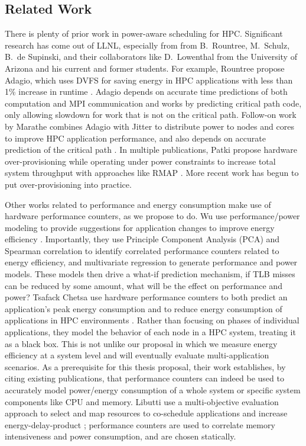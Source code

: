 \subsection{Related Work}


There is plenty of prior work in power-aware scheduling for HPC.
Significant research has come out of LLNL, especially from from B.~Rountree, M.~Schulz, B.~de Supinski, and their collaborators like D.~Lowenthal from the University of Arizona and his current and former students.
For example, Rountree \etal propose Adagio, which uses DVFS for saving energy in HPC applications with less than 1\% increase in runtime \cite{RountreeAdagio}.
Adagio depends on accurate time predictions of both computation and MPI communication and works by predicting critical path code, only allowing slowdown for work that is not on the critical path.
Follow-on work by Marathe \etal combines Adagio with Jitter \cite{Jitter} to distribute power to nodes and cores to improve HPC application performance, and also depends on accurate prediction of the critical path \cite{Marathe2015}.
In multiple publications, Patki \etal propose hardware over-provisioning while operating under power constraints to increase total system throughput with approaches like RMAP \cite{PatkiRMAP}.
More recent work has begun to put over-provisioning into practice.

Other works related to performance and energy consumption make use of hardware performance counters, as we propose to do.
Wu \etal use performance/power modeling to provide suggestions for application changes to improve energy efficiency \cite{WuHPCComputer}.
Importantly, they use Principle Component Analysis (PCA) and Spearman correlation to identify correlated performance counters related to energy efficiency, and multivariate regression to generate performance and power models.
These models then drive a what-if prediction mechanism, \eg if TLB misses can be reduced by some amount, what will be the effect on performance and power?
Tsafack Chetsa \etal use hardware performance counters to both predict an application's peak energy consumption and to reduce energy consumption of applications in HPC environments \cite{Chetsa}.
Rather than focusing on phases of individual applications, they model the behavior of each node in a HPC system, treating it as a black box.
This is not unlike our proposal in which we measure energy efficiency at a system level and will eventually evaluate multi-application scenarios.
As a prerequisite for this thesis proposal, their work establishes, by citing existing publications, that performance counters can indeed be used to accurately model power/energy consumption of a whole system or specific system components like CPU and memory.
Libutti \etal use a multi-objective evaluation approach to select and map resources to co-schedule applications and increase energy-delay-product \cite{Libutti2014}; performance counters are used to correlate memory intensiveness and power consumption, and are chosen statically.

